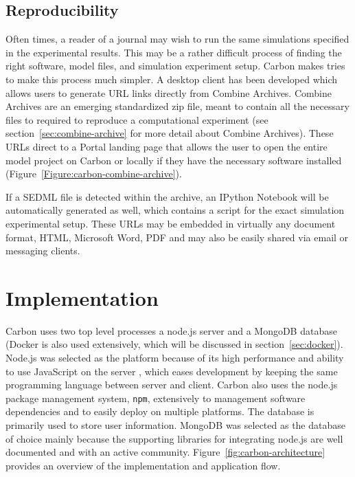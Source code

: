 \subsection{Reproducibility}

Often times, a reader of a journal may wish to run the same simulations specified in the experimental results.
This may be a rather difficult process of finding the right software, model files, and simulation experiment setup.
Carbon makes tries to make this process much simpler.
A desktop client has been developed which allows users to generate URL links directly from Combine Archives. \autocite{combine2014archive}
Combine Archives are an emerging standardized zip file, meant to contain all the necessary files to required to reproduce a computational experiment (see section~\ref{sec:combine-archive} for more detail about Combine Archives).
These URLs direct to a Portal landing page that allows the user to open the entire model project on Carbon or locally if they have the necessary software installed (Figure~\ref{Figure:carbon-combine-archive}).

If a SEDML file is detected within the archive, an IPython Notebook will be automatically generated as well, which contains a script for the exact simulation experimental setup.
These URLs may be embedded in virtually any document format, HTML, Microsoft Word, PDF and may also be easily shared via email or messaging clients.

\section{Implementation}

Carbon uses two top level processes a node.js server and a MongoDB database (Docker is also used extensively, which will be discussed in section~\ref{sec:docker}).
Node.js was selected as the platform because of its high performance and ability to use JavaScript on the server \autocite{tilkov2010node}, which eases development by keeping the same programming language between server and client.
Carbon also uses the node.js package management system, \texttt{npm}, extensively to management software dependencies and to easily deploy on multiple platforms. \autocite{lerner2011forge}
The database is primarily used to store user information.
MongoDB was selected as the database of choice mainly because the supporting libraries for integrating node.js are well documented and with an active community.
Figure~\ref{fig:carbon-architecture} provides an overview of the implementation and application flow.

